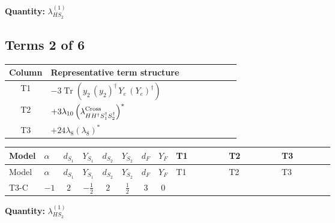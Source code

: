 \documentclass[8pt]{article}
\begin{document}
\begin{landscape}
\begin{longtable}{@{}llcccccc >{\raggedright\arraybackslash}p{0.21\linewidth} >{\raggedright\arraybackslash}p{0.21\linewidth} >{\raggedright\arraybackslash}p{0.21\linewidth}@{}}
\midrule
\bottomrule
\end{longtable}
\clearpage
\noindent\textbf{Quantity: }$\lambda_{HS_2}^{(1)}$\par\smallskip
\subsection*{Terms 2 of 6}
\begin{center}
\begin{tabular}{@{}c >{\raggedright\arraybackslash}p{0.82\linewidth}@{}}
\toprule
Column & Representative term structure \\
\midrule
T1 & \(\displaystyle -3 \operatorname{Tr}\!\left({y_2}\,\left({y_2}\right)^{\dagger}\,{Y_e}\,\left({Y_e}\right)^{\dagger}\right)\) \\
\midrule
T2 & \(\displaystyle +3 {\lambda_{10}} \left({\lambda_{H H^\dagger S_1^\dagger S_2^\dagger}^{\rm Cross}}\right)^{*}\) \\
\midrule
T3 & \(\displaystyle +24 {\lambda_{8}} \left({\lambda_{8}}\right)^{*}\) \\
\midrule
\bottomrule
\end{tabular}
\end{center}
\smallskip
\tiny
\begin{longtable}{@{}llcccccc >{\raggedright\arraybackslash}p{0.21\linewidth} >{\raggedright\arraybackslash}p{0.21\linewidth} >{\raggedright\arraybackslash}p{0.21\linewidth}@{}}
\toprule
Model & $\alpha$ & $d_{S_1}$ & $Y_{S_1}$ & $d_{S_2}$ & $Y_{S_2}$ & $d_F$ & $Y_F$ & T1 & T2 & T3 \\
\midrule
\endfirsthead
\toprule
Model & $\alpha$ & $d_{S_1}$ & $Y_{S_1}$ & $d_{S_2}$ & $Y_{S_2}$ & $d_F$ & $Y_F$ & T1 & T2 & T3 \\
\midrule
\endhead
T3-C & $-1$ & $2$ & $-\frac{1}{2}$ & $2$ & $\frac{1}{2}$ & $3$ & $0$ & \scriptsize\adjustbox{max width=\linewidth}{$\begin{gathered} -3 \operatorname{Tr}\!\left({y_2}\,\left({y_2}\right)^{\dagger}\,{Y_e}\,\left({Y_e}\right)^{\dagger}\right)\end{gathered}$} & \scriptsize\adjustbox{max width=\linewidth}{$\begin{gathered} +3 {\lambda_{10}} \left({\lambda_{H H^\dagger S_1^\dagger S_2^\dagger}^{\rm Cross}}\right)^{*}\end{gathered}$} & \scriptsize\adjustbox{max width=\linewidth}{$\begin{gathered} +24 {\lambda_{8}} \left({\lambda_{8}}\right)^{*}\end{gathered}$} \\
\midrule
\bottomrule
\end{longtable}
\clearpage
\noindent\textbf{Quantity: }$\lambda_{HS_2}^{(1)}$\par\smallskip

\end{landscape}
\end{document}
